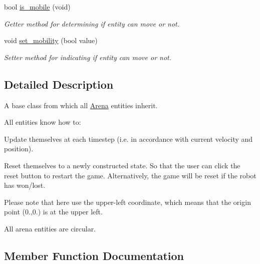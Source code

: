 \begin{DoxyCompactItemize}
\item 
bool \hyperlink{classArenaEntity_a9cfea21220c07502abd084afde49ae65}{is\+\_\+mobile} (void)\hypertarget{classArenaEntity_a9cfea21220c07502abd084afde49ae65}{}\label{classArenaEntity_a9cfea21220c07502abd084afde49ae65}

\begin{DoxyCompactList}\small\item\em Getter method for determining if entity can move or not. \end{DoxyCompactList}\item 
void \hyperlink{classArenaEntity_adb5d3089fec5c28cc989e5834fcdaf6c}{set\+\_\+mobility} (bool value)\hypertarget{classArenaEntity_adb5d3089fec5c28cc989e5834fcdaf6c}{}\label{classArenaEntity_adb5d3089fec5c28cc989e5834fcdaf6c}

\begin{DoxyCompactList}\small\item\em Setter method for indicating if entity can move or not. \end{DoxyCompactList}\end{DoxyCompactItemize}


\subsection{Detailed Description}
A base class from which all \hyperlink{classArena}{Arena} entities inherit. 

All entities know how to\+:


\begin{DoxyEnumerate}
\item Update themselves at each timestep (i.\+e. in accordance with current velocity and position).
\item Reset themselves to a newly constructed state. So that the user can click the reset button to restart the game. Alternatively, the game will be reset if the robot has won/lost.
\end{DoxyEnumerate}

Please note that here use the upper-\/left coordinate, which means that the origin point (0.,0.) is at the upper left.

All arena entities are circular. 

\subsection{Member Function Documentation}
